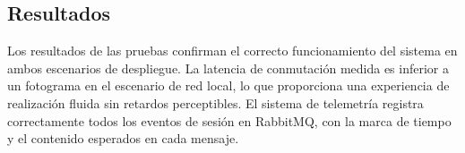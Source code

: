 
\subsection{Resultados}


Los resultados de las pruebas confirman el correcto funcionamiento del sistema en
ambos escenarios de despliegue. La latencia de conmutación medida es inferior a un
fotograma en el escenario de red local, lo que proporciona una experiencia de
realización fluida sin retardos perceptibles. El sistema de telemetría registra
correctamente todos los eventos de sesión en RabbitMQ, con la marca de tiempo y
el contenido esperados en cada mensaje.
